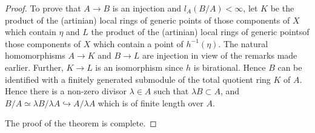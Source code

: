 \begin{proof}
To prove that $A \to B$ is an injection and $l_A (B/A) < \infty$, let $K$ be the product of the (artinian) local rings of generic points of those components of $X$ which contain $\eta$ and $L$ the product of the (artinian) local rings of generic points\pageoriginale of those components of $X$ which contain a point of $h^{-1}(\eta)$. The natural homomorphisms $A \to K$ and $B \to L$ are injection in view of the remarks made earlier. Further, $K \to L$ is an isomorphism since $h$ is birational. Hence $B$ can be identified with a finitely generated submodule of the total quotient ring $K$ of $A$. Hence there is a non-zero divisor $\lambda \in A$ such that $\lambda B \subset A$, and $B/A \simeq \lambda B / \lambda  A \hookrightarrow A / \lambda A$ which is of finite length over $A$.

The proof of the theorem is complete.
\end{proof}

